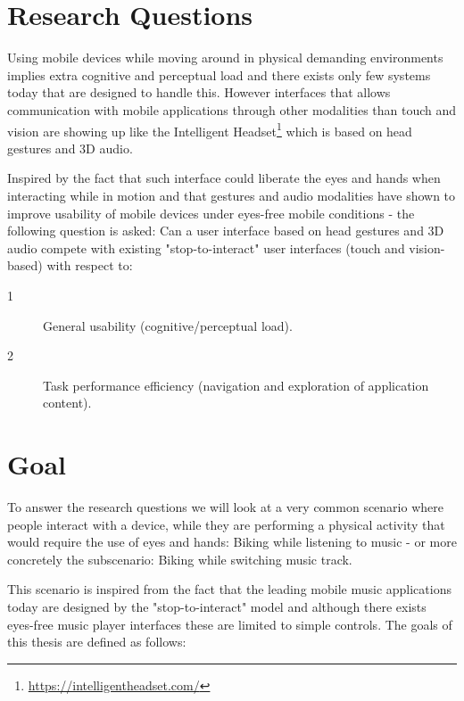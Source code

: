\newpage

\section{Research Questions}
Using mobile devices while moving around in physical demanding environments implies extra cognitive and perceptual load and there exists only few systems today that are designed to handle this. However interfaces that allows communication with mobile applications through other modalities than touch and vision are showing up like the Intelligent Headset\footnote{\url{https://intelligentheadset.com/}} which is based on head gestures and 3D audio.

Inspired by the fact that such interface could liberate the eyes and hands when interacting while in motion and that gestures and audio modalities have shown to improve usability of mobile devices under eyes-free mobile conditions \cite{brewster_multimodaleyes-freeinteraction_2003} - the following question is asked: Can a user interface based on head gestures and 3D audio compete with existing "stop-to-interact" user interfaces (touch and vision-based) with respect to:

\begin{description}
\item[1] General usability (cognitive/perceptual load).
\item[2] Task performance efficiency (navigation and exploration of application content).
\end{description}


\section{Goal}
\label{sec:goal}
To answer the research questions we will look at a very common scenario where people interact with a device, while they are performing a physical activity that would require the use of eyes and hands: Biking while listening to music - or more concretely the subscenario: Biking while switching music track.

This scenario is inspired from the fact that the leading mobile music applications today are designed by the "stop-to-interact" model and although there exists eyes-free music player interfaces these are limited to simple controls. The goals of this thesis are defined as follows:


